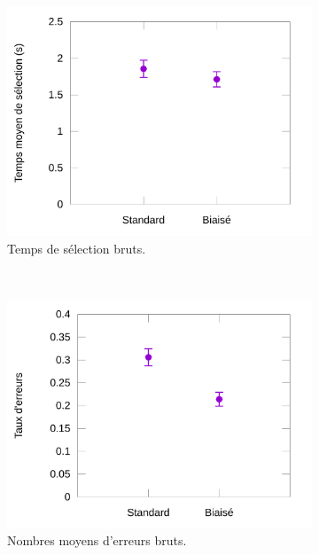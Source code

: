 	\begin{figure}[htbp]
		\begin{subfigure}[t]{0.49\textwidth}
			\centering
			\includegraphics[width=\textwidth]{figures/ch5/hookRawTimes}
			\caption{Temps de sélection bruts.}
			\label{fig:hookRawTimes}
		\end{subfigure}
		~
		\begin{subfigure}[t]{0.49\textwidth}
			\centering
			\includegraphics[width=\textwidth]{figures/ch5/hookRawErrors}
			\caption{Nombres moyens d'erreurs bruts.}
			\label{fig:hookRawErrors}
		\end{subfigure}
		~
		\begin{subfigure}[t]{0.49\textwidth}
			\centering

\end{subfigure}
\end{figure}
